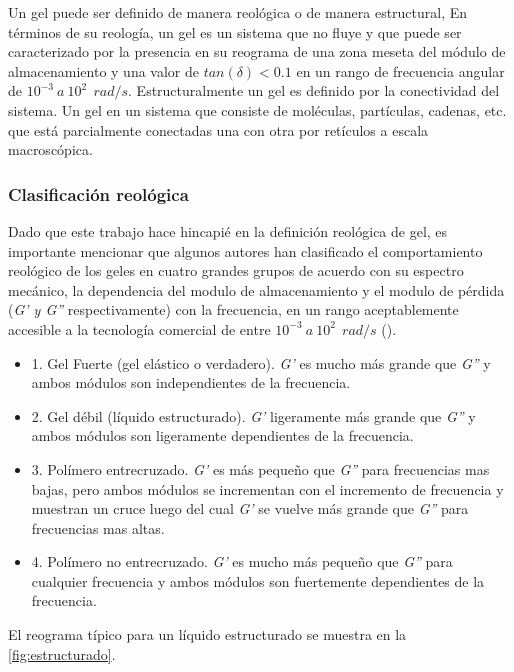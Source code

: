 Un gel puede ser definido de manera reológica o de manera estructural, En términos de su reología, un gel es un sistema que no fluye y que puede ser caracterizado por la presencia en su reograma de una zona meseta del módulo de almacenamiento y una valor de $tan(\delta) < 0.1$ en un rango de frecuencia angular de $10^{-3}~a~10^{2}~~rad/s$. Estructuralmente un gel es definido por la conectividad del sistema. Un gel en un sistema que consiste de moléculas, partículas, cadenas, etc. que está parcialmente conectadas una con otra por retículos a escala macroscópica.

\subsubsection{Clasificación reológica}
Dado que este trabajo hace hincapié en la definición reológica de gel, es importante mencionar que algunos autores han clasificado el comportamiento reológico de los geles en cuatro grandes grupos de acuerdo con su espectro mecánico, la dependencia del modulo de almacenamiento y el modulo de pérdida (\emph{G' y G''} respectivamente) con la frecuencia, en un rango aceptablemente accesible a la tecnología comercial de entre $10^{-3}~a~ 10^{2}~~rad/s$ (\cite{Clark}).

\begin{itemize}
    \item 1. Gel Fuerte (gel elástico o verdadero). \emph{G'} es mucho más grande que \emph{G''} y ambos módulos son independientes de la frecuencia.
    \item 2. Gel débil (líquido estructurado). \emph{G'} ligeramente más grande que \emph{G''} y ambos módulos son ligeramente dependientes de la frecuencia.
    \item 3. Polímero entrecruzado. \emph{G'} es más pequeño que \emph{G''} para frecuencias mas bajas, pero ambos módulos se incrementan con el incremento de frecuencia y muestran un cruce luego del cual \emph{G'} se vuelve más grande que \emph{G''} para frecuencias mas altas.
    \item 4. Polímero no entrecruzado. \emph{G'} es mucho más pequeño que \emph{G''} para cualquier frecuencia y ambos módulos son fuertemente dependientes de la frecuencia.
\end{itemize}

El reograma típico para un líquido estructurado se muestra en la \autoref{fig:estructurado}.

